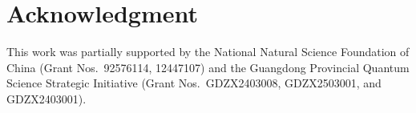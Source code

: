 \documentclass[10pt,a4paper]{article}
\DeclareRobustCommand{\LeanQIT}{\textnormal{\textsc{Lean-QIT}}}
\begin{document}
	
	


\section*{Acknowledgment} This work was partially supported by the National Natural Science Foundation of China (Grant Nos.~92576114, 12447107) and the Guangdong Provincial Quantum Science Strategic Initiative (Grant Nos.~GDZX2403008, GDZX2503001, and GDZX2403001).
\clearpage
\appendix
\end{document}
